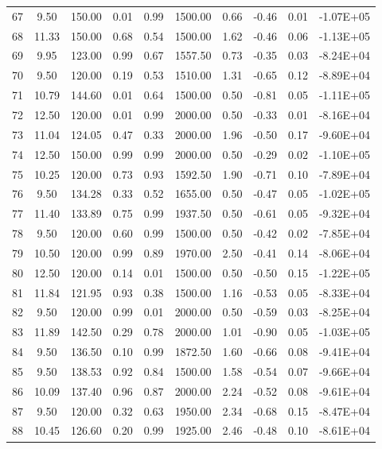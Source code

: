 \begin{landscape}
\begin{center}
\begin{longtable}{|c|c|c|c|c|c|c|c|c|c|}
67 & 9.50  & 150.00 & 0.01 & 0.99 & 1500.00 & 0.66 & -0.46 & 0.01 & -1.07E+05 \\
68 & 11.33 & 150.00 & 0.68 & 0.54 & 1500.00 & 1.62 & -0.46 & 0.06 & -1.13E+05 \\
69 & 9.95  & 123.00 & 0.99 & 0.67 & 1557.50 & 0.73 & -0.35 & 0.03 & -8.24E+04 \\
70 & 9.50  & 120.00 & 0.19 & 0.53 & 1510.00 & 1.31 & -0.65 & 0.12 & -8.89E+04 \\
71 & 10.79 & 144.60 & 0.01 & 0.64 & 1500.00 & 0.50 & -0.81 & 0.05 & -1.11E+05 \\
72 & 12.50 & 120.00 & 0.01 & 0.99 & 2000.00 & 0.50 & -0.33 & 0.01 & -8.16E+04 \\
73 & 11.04 & 124.05 & 0.47 & 0.33 & 2000.00 & 1.96 & -0.50 & 0.17 & -9.60E+04 \\
74 & 12.50 & 150.00 & 0.99 & 0.99 & 2000.00 & 0.50 & -0.29 & 0.02 & -1.10E+05 \\
75 & 10.25 & 120.00 & 0.73 & 0.93 & 1592.50 & 1.90 & -0.71 & 0.10 & -7.89E+04 \\
76 & 9.50  & 134.28 & 0.33 & 0.52 & 1655.00 & 0.50 & -0.47 & 0.05 & -1.02E+05 \\
77 & 11.40 & 133.89 & 0.75 & 0.99 & 1937.50 & 0.50 & -0.61 & 0.05 & -9.32E+04 \\
78 & 9.50  & 120.00 & 0.60 & 0.99 & 1500.00 & 0.50 & -0.42 & 0.02 & -7.85E+04 \\
79 & 10.50 & 120.00 & 0.99 & 0.89 & 1970.00 & 2.50 & -0.41 & 0.14 & -8.06E+04 \\
80 & 12.50 & 120.00 & 0.14 & 0.01 & 1500.00 & 0.50 & -0.50 & 0.15 & -1.22E+05 \\
81 & 11.84 & 121.95 & 0.93 & 0.38 & 1500.00 & 1.16 & -0.53 & 0.05 & -8.33E+04 \\
82 & 9.50  & 120.00 & 0.99 & 0.01 & 2000.00 & 0.50 & -0.59 & 0.03 & -8.25E+04 \\
83 & 11.89 & 142.50 & 0.29 & 0.78 & 2000.00 & 1.01 & -0.90 & 0.05 & -1.03E+05 \\
84 & 9.50  & 136.50 & 0.10 & 0.99 & 1872.50 & 1.60 & -0.66 & 0.08 & -9.41E+04 \\
85 & 9.50  & 138.53 & 0.92 & 0.84 & 1500.00 & 1.58 & -0.54 & 0.07 & -9.66E+04 \\
86 & 10.09 & 137.40 & 0.96 & 0.87 & 2000.00 & 2.24 & -0.52 & 0.08 & -9.61E+04 \\
87 & 9.50  & 120.00 & 0.32 & 0.63 & 1950.00 & 2.34 & -0.68 & 0.15 & -8.47E+04 \\
88 & 10.45 & 126.60 & 0.20 & 0.99 & 1925.00 & 2.46 & -0.48 & 0.10 & -8.61E+04 \\

\end{longtable}
\end{center}
\end{landscape}
